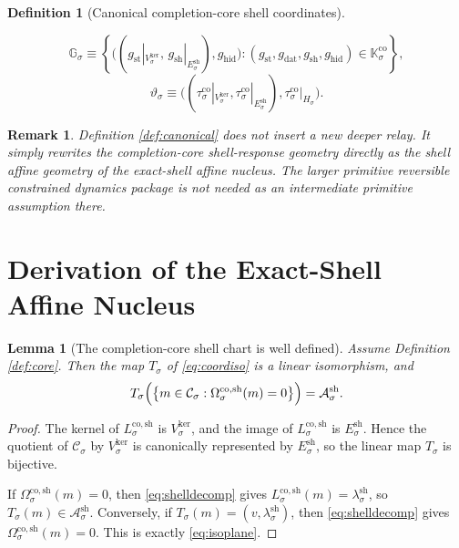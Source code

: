 \documentclass[11pt]{article}
\newcommand{\CoreState}[1]{\mathcal C_{#1}}
\newcommand{\CoreShellMap}[1]{\Omega_{#1}^{\mathrm{co,sh}}}
\newcommand{\CoreSym}[1]{\mathbb K_{#1}^{\mathrm{co}}}
\newcommand{\CoreTime}[1]{\tau_{#1}^{\mathrm{co}}}
\newcommand{\GapSpace}[1]{H_{#1}}
\newcommand{\ShellAffine}[1]{\mathcal A_{#1}^{\mathrm{sh}}}
\newcommand{\ShellNormal}[1]{E_{#1}^{\mathrm{sh}}}
\newcommand{\SymGroup}[1]{\mathbb G_{#1}}
\newcommand{\TimeRev}[1]{\vartheta_{#1}}
\newcommand{\CoreShellLin}[1]{L_{#1}^{\mathrm{co,sh}}}
\newcommand{\ShellOffset}[1]{\lambda_{#1}^{\mathrm{sh}}}
\newcommand{\ShellKer}[1]{V_{#1}^{\mathrm{ker}}}
\newcommand{\CoordIso}[1]{T_{#1}}
\newtheorem{definition}{Definition}
\newtheorem{lemma}{Lemma}
\newtheorem{remark}{Remark}
\begin{document}
\begin{definition}[Canonical completion-core shell coordinates]
\begin{enumerate}
    \[
    \SymGroup{\sigma}
    \equiv
    \left\{
    \bigl(
    (g_{\mathrm{st}}|_{\ShellKer{\sigma}},\,g_{\mathrm{sh}}|_{\ShellNormal{\sigma}}),
    g_{\mathrm{hid}}
    \bigr):
    (g_{\mathrm{st}},g_{\mathrm{dat}},g_{\mathrm{sh}},g_{\mathrm{hid}})
    \in\CoreSym{\sigma}
    \right\},
    \]
    \[
    \TimeRev{\sigma}
    \equiv
    \bigl(
    (\CoreTime{\sigma}|_{\ShellKer{\sigma}},
    \CoreTime{\sigma}|_{\ShellNormal{\sigma}}),
    \CoreTime{\sigma}|_{\GapSpace{\sigma}}
    \bigr).
    \]
\end{enumerate}
\end{definition}

\begin{remark}
Definition \ref{def:canonical} does not insert a new deeper relay. It simply rewrites the completion-core shell-response geometry directly as the shell affine geometry of the exact-shell affine nucleus. The larger primitive reversible constrained dynamics package is not needed as an intermediate primitive assumption there.
\end{remark}

\section{Derivation of the Exact-Shell Affine Nucleus}

\begin{lemma}[The completion-core shell chart is well defined]
\label{lem:chart}
Assume Definition \ref{def:core}. Then the map \(\CoordIso{\sigma}\) of \eqref{eq:coordiso} is a linear isomorphism, and
\begin{equation}
\CoordIso{\sigma}
\Bigl(
\left\{
m\in\CoreState{\sigma}:
\CoreShellMap{\sigma}(m)=0
\right\}
\Bigr)
=
\ShellAffine{\sigma}.
\label{eq:isoplane}
\end{equation}
\end{lemma}

\begin{proof}
The kernel of \(\CoreShellLin{\sigma}\) is \(\ShellKer{\sigma}\), and the image of \(\CoreShellLin{\sigma}\) is \(\ShellNormal{\sigma}\). Hence the quotient of \(\CoreState{\sigma}\) by \(\ShellKer{\sigma}\) is canonically represented by \(\ShellNormal{\sigma}\), so the linear map \(\CoordIso{\sigma}\) is bijective.

If \(\CoreShellMap{\sigma}(m)=0\), then \eqref{eq:shelldecomp} gives \(\CoreShellLin{\sigma}(m)=\ShellOffset{\sigma}\), so \(\CoordIso{\sigma}(m)\in\ShellAffine{\sigma}\). Conversely, if \(\CoordIso{\sigma}(m)=(v,\ShellOffset{\sigma})\), then \eqref{eq:shelldecomp} gives \(\CoreShellMap{\sigma}(m)=0\). This is exactly \eqref{eq:isoplane}.
\end{proof}
\end{document}
